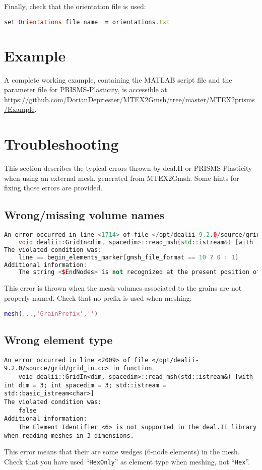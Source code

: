 \documentclass[a4paper]{scrartcl}
\begin{document}
Finally, check that the orientation file is used:
\begin{lstlisting}[language=ruby]
set Orientations file name  = orientations.txt
\end{lstlisting}

	\section{Example}
	A complete working example, containing the MATLAB script file and the parameter file for PRISMS-Plasticity, is accessible at \url{https://github.com/DorianDepriester/MTEX2Gmsh/tree/master/MTEX2prisms/Example}.
	
	\section{Troubleshooting}
	This section describes the typical errors thrown by deal.II or PRISMS-Plasticity when using an external mesh, generated from MTEX2Gmsh. Some hints for fixing those errors are provided.
	
		\subsection{Wrong/missing volume names}
\begin{lstlisting}[language=c++]
An error occurred in line <1714> of file </opt/dealii-9.2.0/source/grid/grid_in.cc> in function
    void dealii::GridIn<dim, spacedim>::read_msh(std::istream&) [with int dim = 3; int spacedim = 3; std::istream = std::basic_istream<char>]
The violated condition was:
    line == begin_elements_marker[gmsh_file_format == 10 ? 0 : 1]
Additional information:
    The string <$EndNodes> is not recognized at the present position of a Gmsh Mesh file.
\end{lstlisting}
This error is thrown when the mesh volumes associated to the grains are not properly named. Check that no prefix is used when meshing:
	\begin{lstlisting}[language=Matlab]
mesh(...,'GrainPrefix','')
	\end{lstlisting}
	
	
	\subsection{Wrong element type}
\begin{lstlisting}
An error occurred in line <2009> of file </opt/dealii-9.2.0/source/grid/grid_in.cc> in function
    void dealii::GridIn<dim, spacedim>::read_msh(std::istream&) [with int dim = 3; int spacedim = 3; std::istream = std::basic_istream<char>]
The violated condition was:
    false
Additional information:
    The Element Identifier <6> is not supported in the deal.II library when reading meshes in 3 dimensions.
\end{lstlisting}
This error means that their are some wedges (6-node elements) in the mesh. Check that you have used ``\texttt{HexOnly}'' as element type when meshing, not ``\texttt{Hex}''.
	
	


\end{document}
